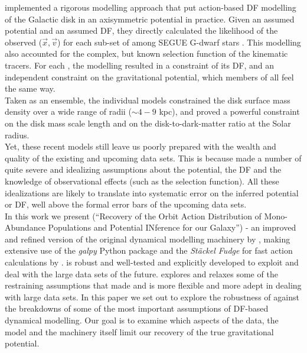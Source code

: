\citet{bov13} implemented a rigorous modelling approach that put action-based DF modelling of the Galactic disk in an axisymmetric potential in practice. Given an assumed potential and an assumed DF, they directly calculated the likelihood of the observed ($\vec{x},\vec{v}$) for each sub-set of \MAP{} among SEGUE G-dwarf stars \citep{2009AJ....137.4377Y}. This modelling also accounted for the complex, but known selection function of the kinematic tracers.  For each \MAP{}, the modelling resulted in a constraint of its DF, and an independent constraint on the gravitational potential, which members of all \MAPs{} feel the same way. \\
Taken as an ensemble, the individual \MAP{} models constrained the disk surface mass density over a wide range of radii ($\sim 4-9$ kpc), and proved a powerful constraint on the disk mass scale length and on the disk-to-dark-matter ratio at the Solar radius. \\

Yet, these recent models still leave us poorly prepared with the wealth and quality of the existing and upcoming data sets. This is because \citet{bov13} made a number of quite severe and idealizing assumptions about the potential, the DF and the knowledge of observational effects (such as the selection function). All these idealizations are likely to translate into systematic error on the inferred potential or DF, well above the formal error bars of the upcoming data sets. \\

In this work we present \RM{} (``\textsc{R}ecovery of the \textsc{O}rbit \textsc{A}ction \textsc{D}istribution of \textsc{M}ono-\textsc{A}bundance \textsc{P}opulations and \textsc{P}otential \textsc{IN}ference for our \textsc{G}alaxy'') - an improved and refined version of the original dynamical modelling machinery by \citet{bov13}, making extensive use of the \emph{galpy} Python package \citep{bov15} and the \emph{St\"{a}ckel Fudge} for fast action calculations by \cite{2012MNRAS.426.1324B}. \RM{} is robust and well-tested and explicitly developed to exploit and deal with the large data sets of the future. \RM{} explores and relaxes some of the restraining assumptions that \citet{bov13} made and is more flexible and more adept in dealing with large data sets. In this paper we set out to explore the robustness of \RM{} against the breakdowns of some of the most important assumptions of DF-based dynamical modelling. Our goal is to examine which aspects of the data, the model and the machinery itself limit our recovery of the true gravitational potential.\\

